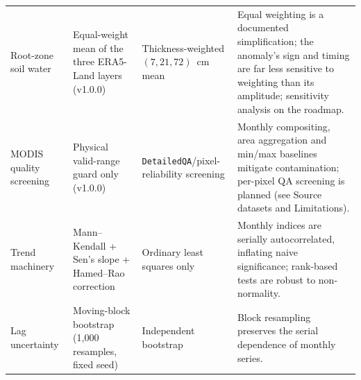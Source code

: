 \documentclass[10pt,a4paper]{article}
\begin{document}
\begin{table}[t]
\begin{tabularx}{\textwidth}{@{}p{}p{}p{}X@{}}
Root-zone soil water & Equal-weight mean of the three ERA5-Land layers (v1.0.0) & Thickness-weighted $(7,21,72)$~cm mean & Equal weighting is a documented simplification; the anomaly's sign and timing are far less sensitive to weighting than its amplitude; sensitivity analysis on the roadmap. \\
MODIS quality screening & Physical valid-range guard only (v1.0.0) & \texttt{DetailedQA}/pixel-reliability screening & Monthly compositing, area aggregation and min/max baselines mitigate contamination; per-pixel QA screening is planned (see Source datasets and Limitations). \\
Trend machinery & Mann--Kendall + Sen's slope + Hamed--Rao correction & Ordinary least squares only & Monthly indices are serially autocorrelated, inflating naive significance; rank-based tests are robust to non-normality\citep{Mann1945,Sen1968,HamedRao1998}. \\
Lag uncertainty & Moving-block bootstrap (1{,}000 resamples, fixed seed) & Independent bootstrap & Block resampling preserves the serial dependence of monthly series\citep{Kunsch1989}. \\
\bottomrule
\end{tabularx}
\end{table}
\end{document}
